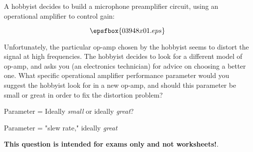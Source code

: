

A hobbyist decides to build a microphone preamplifier circuit, using an operational amplifier to control gain:

$$\epsfbox{03948x01.eps}$$

Unfortunately, the particular op-amp chosen by the hobbyist seems to distort the signal at high frequencies.  The hobbyist decides to look for a different model of op-amp, and asks you (an electronics technician) for advice on choosing a better one.  What specific operational amplifier performance parameter would you suggest the hobbyist look for in a new op-amp, and should this parameter be small or great in order to fix the distortion problem?

\vskip 10pt

Parameter = \hskip 150pt Ideally {\it small} or ideally {\it great}?







Parameter = "slew rate," ideally {\it great}







{\bf This question is intended for exams only and not worksheets!}.



